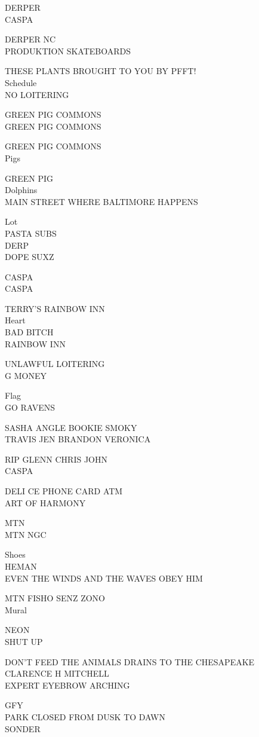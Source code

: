 \documentclass[10pt,letterpaper]{article}
\begin{document}
DERPER\\
CASPA

DERPER NC\\
PRODUKTION SKATEBOARDS

THESE PLANTS BROUGHT TO YOU BY PFFT!\\
Schedule\\
NO LOITERING

GREEN PIG COMMONS\\
GREEN PIG COMMONS

GREEN PIG COMMONS\\
Pigs

GREEN PIG\\
Dolphins\\
MAIN STREET WHERE BALTIMORE HAPPENS

Lot\\
PASTA SUBS\\
DERP\\
DOPE SUXZ

CASPA\\
CASPA

TERRY'S RAINBOW INN\\
Heart\\
BAD BITCH\\
RAINBOW INN

UNLAWFUL LOITERING\\
G MONEY

Flag\\
GO RAVENS

SASHA ANGLE BOOKIE SMOKY\\
TRAVIS JEN BRANDON VERONICA

RIP GLENN CHRIS JOHN\\
CASPA

DELI CE PHONE CARD ATM\\
ART OF HARMONY

MTN\\
MTN NGC

Shoes\\
HEMAN\\
EVEN THE WINDS AND THE WAVES OBEY HIM

MTN FISHO SENZ ZONO\\
Mural

NEON\\
SHUT UP

DON'T FEED THE ANIMALS DRAINS TO THE CHESAPEAKE\\
CLARENCE H MITCHELL\\
EXPERT EYEBROW ARCHING

GFY\\
PARK CLOSED FROM DUSK TO DAWN\\
SONDER
\end{document}
